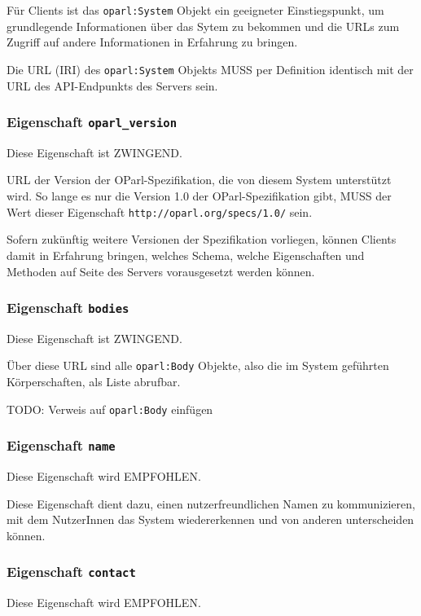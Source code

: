 \documentclass[,a4paper]{article}
\begin{document}
Für Clients ist das \texttt{oparl:System} Objekt ein geeigneter
Einstiegspunkt, um grundlegende Informationen über das Sytem zu bekommen
und die URLs zum Zugriff auf andere Informationen in Erfahrung zu
bringen.

Die URL (IRI) des \texttt{oparl:System} Objekts MUSS per Definition
identisch mit der URL des API-Endpunkts des Servers sein.

\subsubsection{Eigenschaft \texttt{oparl\_version}}

Diese Eigenschaft ist ZWINGEND.

URL der Version der OParl-Spezifikation, die von diesem System
unterstützt wird. So lange es nur die Version 1.0 der
OParl-Spezifikation gibt, MUSS der Wert dieser Eigenschaft
\texttt{http://oparl.org/specs/1.0/} sein.

Sofern zukünftig weitere Versionen der Spezifikation vorliegen, können
Clients damit in Erfahrung bringen, welches Schema, welche Eigenschaften
und Methoden auf Seite des Servers vorausgesetzt werden können.

\subsubsection{Eigenschaft \texttt{bodies}}

Diese Eigenschaft ist ZWINGEND.

Über diese URL sind alle \texttt{oparl:Body} Objekte, also die im System
geführten Körperschaften, als Liste abrufbar.

TODO: Verweis auf \texttt{oparl:Body} einfügen

\subsubsection{Eigenschaft \texttt{name}}

Diese Eigenschaft wird EMPFOHLEN.

Diese Eigenschaft dient dazu, einen nutzerfreundlichen Namen zu
kommunizieren, mit dem NutzerInnen das System wiedererkennen und von
anderen unterscheiden können.

\subsubsection{Eigenschaft \texttt{contact}}

Diese Eigenschaft wird EMPFOHLEN.
\end{document}
